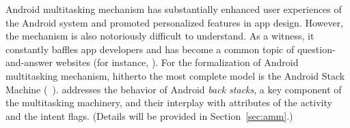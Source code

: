 Android multitasking mechanism has substantially enhanced user experiences of the Android system and promoted personalized features in app design. However, the mechanism is also notoriously difficult to understand. As a witness, it constantly baffles app developers and has become a common topic of question-and-answer websites (for instance, \cite{stackoverflow}).
%
%
For the formalization of Android multitasking mechanism, hitherto the most complete %
model is the Android Stack Machine ({\AMASS}~\cite{HC+19}). %
%
{\AMASS} addresses the behavior of Android \emph{back stacks}, a key component of the multitasking machinery, and their interplay with attributes of the activity and the intent flags. 
(Details will be provided in Section~\ref{sec:amm}.)

